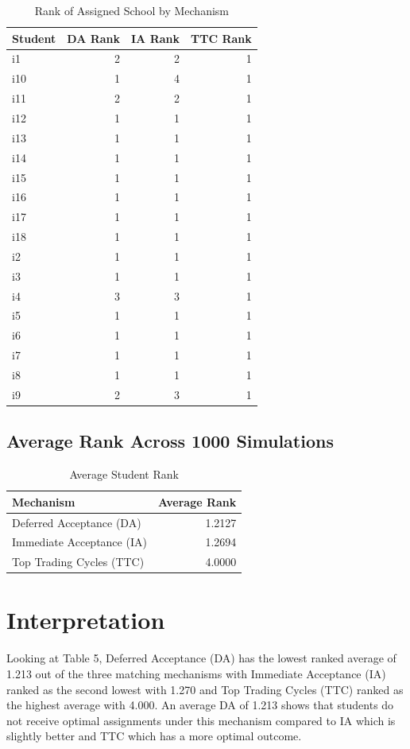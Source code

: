 \documentclass{article}
\begin{document}
\begin{table}[H]
\centering
\caption{Rank of Assigned School by Mechanism}
\begin{tabular}{lrrr}
\toprule
Student & DA Rank & IA Rank & TTC Rank \\
\midrule
i1 & 2 & 2 & 1 \\
i10 & 1 & 4 & 1 \\
i11 & 2 & 2 & 1 \\
i12 & 1 & 1 & 1 \\
i13 & 1 & 1 & 1 \\
i14 & 1 & 1 & 1 \\
i15 & 1 & 1 & 1 \\
i16 & 1 & 1 & 1 \\
i17 & 1 & 1 & 1 \\
i18 & 1 & 1 & 1 \\
i2 & 1 & 1 & 1 \\
i3 & 1 & 1 & 1 \\
i4 & 3 & 3 & 1 \\
i5 & 1 & 1 & 1 \\
i6 & 1 & 1 & 1 \\
i7 & 1 & 1 & 1 \\
i8 & 1 & 1 & 1 \\
i9 & 2 & 3 & 1 \\
\bottomrule
\end{tabular}
\end{table}

\subsection*{Average Rank Across 1000 Simulations}

\begin{table}[H]
\centering
\caption{Average Student Rank}
\begin{tabular}{lr}
\toprule
Mechanism & Average Rank \\
\midrule
Deferred Acceptance (DA) & 1.2127 \\
Immediate Acceptance (IA) & 1.2694 \\
Top Trading Cycles (TTC) & 4.0000 \\
\bottomrule
\end{tabular}
\end{table}

\section*{Interpretation}

Looking at Table 5, Deferred Acceptance (DA) has the lowest ranked average of 1.213 out of the three matching mechanisms with Immediate Acceptance (IA) ranked as the second lowest with 1.270 and Top Trading Cycles (TTC) ranked as the highest average with 4.000. An average DA of 1.213 shows that students do not receive optimal assignments under this mechanism compared to IA which is slightly better and TTC which has a more optimal outcome. 
\end{document}
